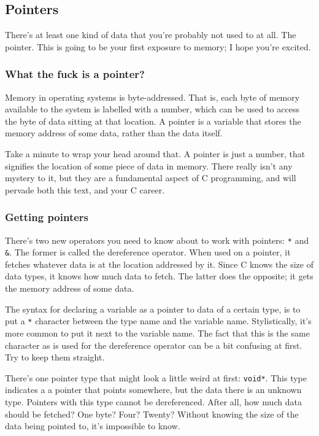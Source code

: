 \documentclass[ebook,11pt,oneside,openany]{memoir}
\begin{document}
\subsection{Pointers}
There's at least one kind of data that you're probably not used to at all. The pointer. This is going to be your first exposure to memory; I hope you're excited.

\subsubsection{What the fuck is a pointer?}
\label{sec:wtf}

Memory in operating systems is byte-addressed. That is, each byte of memory available to the system is labelled with a number, which can be used to access the byte of data sitting at that location. A pointer is a variable that stores the memory address of some data, rather than the data itself. 

Take a minute to wrap your head around that. A pointer is just a number, that signifies the location of some piece of data in memory. There really isn't any mystery to it, but they are a fundamental aspect of C programming, and will pervade both this text, and your C career.

\subsubsection{Getting pointers}

There's two new operators you need to know about to work with pointers: \texttt{*} and \texttt{\&}. The former is called the dereference operator. When used on a pointer, it fetches whatever data is at the location addressed by it. Since C knows the size of data types, it knows how much data to fetch. The latter does the opposite; it gets the memory address of some data.

The syntax for declaring a variable as a pointer to data of a certain type, is to put a \texttt{*} character between the type name and the variable name. Stylistically, it's more common to put it next to the variable name. The fact that this is the same character as is used for the dereference operator can be a bit confusing at first. Try to keep them straight.

There's one pointer type that might look a little weird at first: \texttt{void*}. This type indicates a a pointer that points somewhere, but the data there is an unknown type. Pointers with this type cannot be dereferenced. After all, how much data should be fetched? One byte? Four? Twenty? Without knowing the size of the data being pointed to, it's impossible to know.
\end{document}
